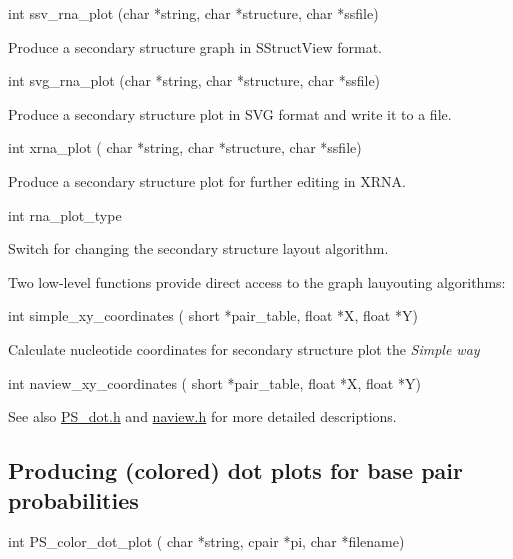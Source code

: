\begin{DoxyVerb}int ssv_rna_plot (char *string,
                  char *structure,
                  char *ssfile)
\end{DoxyVerb}
 Produce a secondary structure graph in S\+Struct\+View format.

\begin{DoxyVerb}int svg_rna_plot (char *string,
                  char *structure,
                  char *ssfile)
\end{DoxyVerb}
 Produce a secondary structure plot in S\+VG format and write it to a file.

\begin{DoxyVerb}int xrna_plot ( char *string,
                char *structure,
                char *ssfile)
\end{DoxyVerb}
 Produce a secondary structure plot for further editing in X\+R\+NA.

\begin{DoxyVerb}int rna_plot_type
\end{DoxyVerb}
 Switch for changing the secondary structure layout algorithm.

Two low-\/level functions provide direct access to the graph lauyouting algorithms\+:

\begin{DoxyVerb}int simple_xy_coordinates ( short *pair_table,
                            float *X,
                            float *Y)
\end{DoxyVerb}
 Calculate nucleotide coordinates for secondary structure plot the {\itshape Simple way}

\begin{DoxyVerb}int naview_xy_coordinates ( short *pair_table,
                            float *X,
                            float *Y)
\end{DoxyVerb}


\begin{DoxySeeAlso}{See also}
\mbox{\hyperlink{_p_s__dot_8h}{P\+S\+\_\+dot.\+h}} and \mbox{\hyperlink{naview_8h}{naview.\+h}} for more detailed descriptions.
\end{DoxySeeAlso}
\hypertarget{plots_utils_dot}{}\subsection{Producing (colored) dot plots for base pair probabilities}\label{plots_utils_dot}
\begin{DoxyVerb}int PS_color_dot_plot ( char *string,
                        cpair *pi,
                        char *filename)
\end{DoxyVerb}


